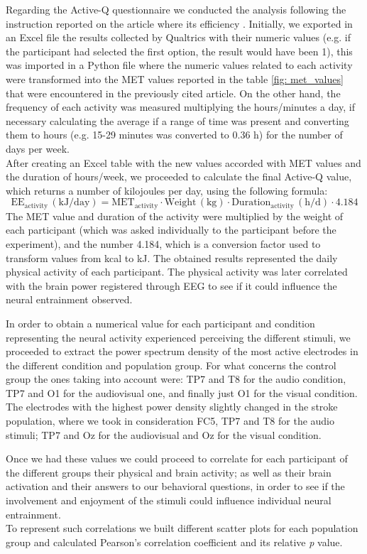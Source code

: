 Regarding the Active-Q questionnaire we conducted the analysis following the instruction reported on the article where its efficiency \parencite{Bonn_2012}. Initially, we exported in an Excel file the results collected by Qualtrics with their numeric values (e.g. if the participant had selected the first option, the result would have been 1), this was imported in a Python file where the numeric values related to each activity were transformed into the MET values reported in the table \ref{fig: met_values} that were encountered in the previously cited article. On the other hand, the frequency of each activity was measured multiplying the hours/minutes a day, if necessary calculating the average if a range of time was present and converting them to hours (e.g. 15-29 minutes was converted to 0.36 h) for the number of days per week.  \\
After creating an Excel table with the new values accorded with MET values and the duration of hours/week, we proceeded to calculate the final Active-Q value, which returns a number of kilojoules per day, using the following formula: 
\[
\text{EE}_{\text{activity}} \, (\text{kJ/day}) = \text{MET}_{\text{activity}} \cdot \text{Weight} \, (\text{kg}) \cdot \text{Duration}_{\text{activity}} \, (\text{h/d}) \cdot 4.184
\]
The MET value and duration of the activity were multiplied by the weight of each participant (which was asked individually to the participant before the experiment), and the number 4.184, which is a conversion factor used to transform values from kcal to kJ. The obtained results represented the daily physical activity of each participant. The physical activity was later correlated with the brain power registered through EEG to see if it could influence the neural entrainment observed. 

In order to obtain a numerical value for each participant and condition representing the neural activity experienced perceiving the different stimuli, we proceeded to extract the power spectrum density of the most active electrodes in the different condition and population group. For what concerns the control group the ones taking into account were: TP7 and T8 for the audio condition, TP7 and O1 for the audiovisual one, and finally just O1 for the visual condition. The electrodes with the highest power density slightly changed in the stroke population, where we took in consideration FC5, TP7 and T8 for the audio stimuli; TP7 and Oz for the audiovisual and Oz for the visual condition. 

Once we had these values we could proceed to correlate for each participant of the different groups their physical and brain activity; as well as their brain activation and their answers to our behavioral questions, in order to see if the involvement and enjoyment of the stimuli could influence individual neural entrainment. \\
To represent such correlations we built different scatter plots for each population group and calculated Pearson's correlation coefficient and its relative \textit{p} value.